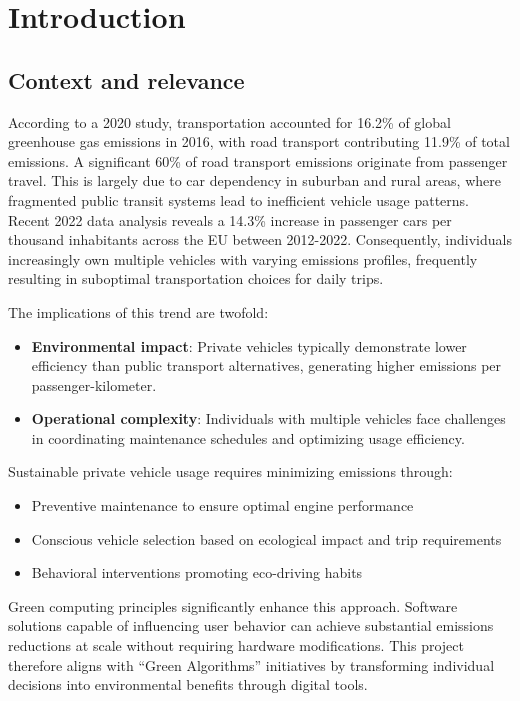 \chapter{Introduction}

\section{Context and relevance}

According to a 2020 study, transportation accounted for 16.2\% of global greenhouse gas emissions in 2016, with road transport contributing 11.9\% of total emissions. A significant 60\% of road transport emissions originate from passenger travel\cite{owid-ghg-emissions-by-sector}. This is largely due to car dependency in suburban and rural areas, where fragmented public transit systems lead to inefficient vehicle usage patterns. Recent 2022 data analysis reveals a 14.3\% increase in passenger cars per thousand inhabitants across the EU between 2012-2022\cite{passengers-cars-per-thousand-people}. Consequently, individuals increasingly own multiple vehicles with varying emissions profiles, frequently resulting in suboptimal transportation choices for daily trips.

The implications of this trend are twofold:
\begin{itemize}
    \item \textbf{Environmental impact}: Private vehicles typically demonstrate lower efficiency than public transport alternatives, generating higher emissions per passenger-kilometer.
    
    \item \textbf{Operational complexity}: Individuals with multiple vehicles face challenges in coordinating maintenance schedules and optimizing usage efficiency.
\end{itemize}

Sustainable private vehicle usage requires minimizing emissions through:
\begin{itemize}
    \item Preventive maintenance to ensure optimal engine performance
    
    \item Conscious vehicle selection based on ecological impact and trip requirements
    
    \item Behavioral interventions promoting eco-driving habits
\end{itemize}

Green computing principles significantly enhance this approach. Software solutions capable of influencing user behavior can achieve substantial emissions reductions at scale without requiring hardware modifications. This project therefore aligns with ``Green Algorithms'' initiatives by transforming individual decisions into environmental benefits through digital tools.

